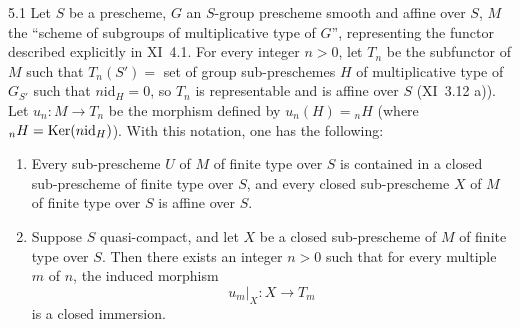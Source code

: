 \par{}
\par
{}
\begin{theorem}{5.1}\label{XII.5.1}
Let $S$ be a prescheme, $G$ an $S$-group prescheme smooth and affine over $S$, $M$ the ``scheme of subgroups of multiplicative type of $G$'', representing the functor described explicitly in XI~4.1. For every integer $n>0$, let $T_n$ be the subfunctor of $M$ such that $T_n(S')=$ set of group sub-preschemes $H$ of multiplicative type of $G_{S'}$ such that $n\mathrm{id}_H=0$, so $T_n$ is representable and is affine over $S$ (XI~3.12 a)). Let $u_n:M\to T_n$ be the morphism defined by $u_n(H)={}_nH$ (where ${}_nH=\operatorname{Ker}(n\mathrm{id}_H)$). With this notation, one has the following:
\begin{enumerate}[label=\alph*)]
\item Every sub-prescheme $U$ of $M$ of finite type over $S$ is contained in a closed sub-prescheme of finite type over $S$, and every closed sub-prescheme $X$ of $M$ of finite type over $S$ is affine over $S$.
\item Suppose $S$ quasi-compact, and let $X$ be a closed sub-prescheme of $M$ of finite type over $S$. Then there exists an integer $n>0$ such that for every multiple $m$ of $n$, the induced morphism
\[
u_m|_X:X\to T_m
\]
is a closed immersion.
\end{enumerate}
\end{theorem}
